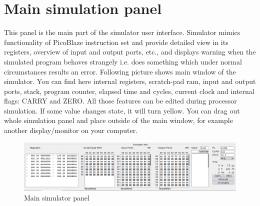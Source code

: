 \section{Main simulation panel}
    This panel is the main part of the simulator user interface. Simulator mimics functionality of PicoBlaze instruction set and provide detailed view in its registers, overview of input and output ports, etc., and displays warning when the simulated program behaves strangely i.e. does something which under normal circumstances results an error. Following picture shows main window of the simulator. You can find here internal registers, scratch-pad ram, input and output ports, stack, program counter, elapsed time and cycles, current clock and internal flags: CARRY and ZERO. All those features can be edited during processor simulation. If some value changes state, it will turn yellow. You can drag out whole simulation panel and place outside of the main window, for example another display/monitor on your computer.

   \begin{figure}[h!]
        \centering
        \includegraphics[width=\textwidth]{img/bottom_panel.png}
        \caption{Main simulator panel}
    \end{figure}

